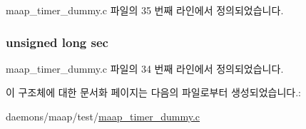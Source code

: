 maap\+\_\+timer\+\_\+dummy.\+c 파일의 35 번째 라인에서 정의되었습니다.

\subsubsection[{\texorpdfstring{sec}{sec}}]{\setlength{\rightskip}{0pt plus 5cm}unsigned long sec}\hypertarget{structtesttime_ae2b5b8923256b96d926940d616058907}{}\label{structtesttime_ae2b5b8923256b96d926940d616058907}


maap\+\_\+timer\+\_\+dummy.\+c 파일의 34 번째 라인에서 정의되었습니다.



이 구조체에 대한 문서화 페이지는 다음의 파일로부터 생성되었습니다.\+:\begin{DoxyCompactItemize}
\item 
daemons/maap/test/\hyperlink{maap__timer__dummy_8c}{maap\+\_\+timer\+\_\+dummy.\+c}\end{DoxyCompactItemize}

